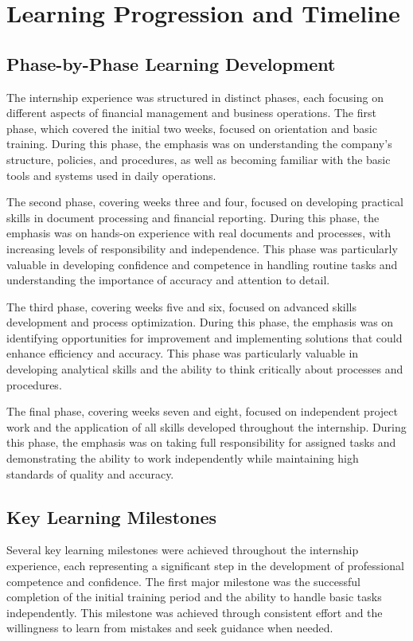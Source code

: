 \section{Learning Progression and Timeline}

\subsection{Phase-by-Phase Learning Development}
The internship experience was structured in distinct phases, each focusing on different aspects of financial management and business operations. The first phase, which covered the initial two weeks, focused on orientation and basic training. During this phase, the emphasis was on understanding the company's structure, policies, and procedures, as well as becoming familiar with the basic tools and systems used in daily operations.

The second phase, covering weeks three and four, focused on developing practical skills in document processing and financial reporting. During this phase, the emphasis was on hands-on experience with real documents and processes, with increasing levels of responsibility and independence. This phase was particularly valuable in developing confidence and competence in handling routine tasks and understanding the importance of accuracy and attention to detail.

The third phase, covering weeks five and six, focused on advanced skills development and process optimization. During this phase, the emphasis was on identifying opportunities for improvement and implementing solutions that could enhance efficiency and accuracy. This phase was particularly valuable in developing analytical skills and the ability to think critically about processes and procedures.

The final phase, covering weeks seven and eight, focused on independent project work and the application of all skills developed throughout the internship. During this phase, the emphasis was on taking full responsibility for assigned tasks and demonstrating the ability to work independently while maintaining high standards of quality and accuracy.

\subsection{Key Learning Milestones}
Several key learning milestones were achieved throughout the internship experience, each representing a significant step in the development of professional competence and confidence. The first major milestone was the successful completion of the initial training period and the ability to handle basic tasks independently. This milestone was achieved through consistent effort and the willingness to learn from mistakes and seek guidance when needed.

